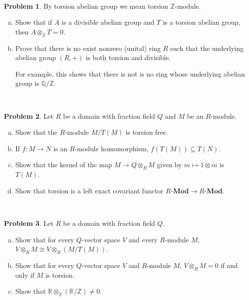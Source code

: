 \documentclass[11pt]{article}
\newcommand{\Q}{\mathbb{Q}}
\newcommand{\Z}{\mathbb{Z}}
\theoremstyle{definition}
\newtheorem{problem}{Problem}
\begin{document}
\vspace{2em}

\noindent
{} 


\



\begin{problem} By torsion abelian group we mean torsion $\Z$-module.
	\begin{enumerate}[a)]
		\item Show that if $A$ is a divisible abelian group and $T$ is a torsion abelian group, then $A \otimes_\Z T = 0$.
		\item Prove that there is no exist nonzero (unital) ring $R$ such that the underlying abelian group $(R,+)$ is both torsion and divisible. 
		
		\noindent
		For example, this shows that there is not is no ring whose underlying abelian group is $\Q/\Z$.
	\end{enumerate}
\end{problem}


\


\begin{problem} Let $R$ be a domain with fraction field $Q$ and $M$ be an $R$-module.
	\begin{enumerate}[a)]
		\item Show that the $R$-module $M/T(M)$ is torsion free.
		\item If $f\!: M \longrightarrow N$ is an $R$-module homomorphism, $f(T(M)) \subseteq T(N)$.
		\item Show that the kernel of the map $M \longrightarrow Q \otimes_R M$ given by $m \mapsto 1 \otimes m$ is $T(M)$.		
		\item Show that torsion is a left exact covariant functor $R\textbf{-Mod} \to R\textbf{-Mod}$.
	\end{enumerate}
\end{problem}

\

\begin{problem}
	Let $R$ be a domain with fraction field $Q$.
	\begin{enumerate}[a)]
		\item Show that for every $Q$-vector space $V$ and every $R$-module $M$, $V \otimes_R M \cong V \otimes_R (M/T(M))$.
		\item Show that for every $Q$-vector space $V$ and $R$-module $M$, $V \otimes_R M = 0$ if and only if $M$ is torsion.
		\item Show that $\mathbb{R} \otimes_\mathbb{Z} (\mathbb{R} / \mathbb{Z}) \neq 0$.
	\end{enumerate}
\end{problem}
\end{document}
